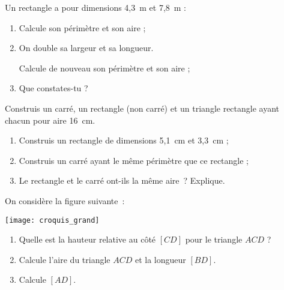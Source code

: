 \begin{exercice}[Agrandissement]
Un rectangle a pour dimensions 4,3 m et 7,8 m :
\begin{enumerate}
 \item Calcule son périmètre et son aire ;
 \item On double sa largeur et sa longueur.
 
Calcule de nouveau son périmètre et son aire ;
 \item Que constates-tu ?
 \end{enumerate}
\end{exercice}


\begin{exercice}
Construis un carré, un rectangle (non carré) et un triangle rectangle ayant chacun pour aire 16 cm.
\end{exercice}


\begin{exercice}
\begin{enumerate}
 \item Construis un rectangle de dimensions 5,1 cm et 3,3 cm ;
 \item Construis un carré ayant le même périmètre que ce rectangle ;
 \item Le rectangle et le carré ont-ils la même aire ? Explique.
 \end{enumerate}
\end{exercice}


\begin{exercice}
On considère la figure suivante :
\begin{center} \texttt{[image: croquis\_grand]} \end{center}
\begin{enumerate}
 \item Quelle est la hauteur relative au côté $[CD]$ pour le triangle $ACD$ ?
 \item Calcule l'aire du triangle $ACD$ et la longueur $[BD]$.
 \item Calcule $[AD]$.
 \end{enumerate}
\end{exercice}


